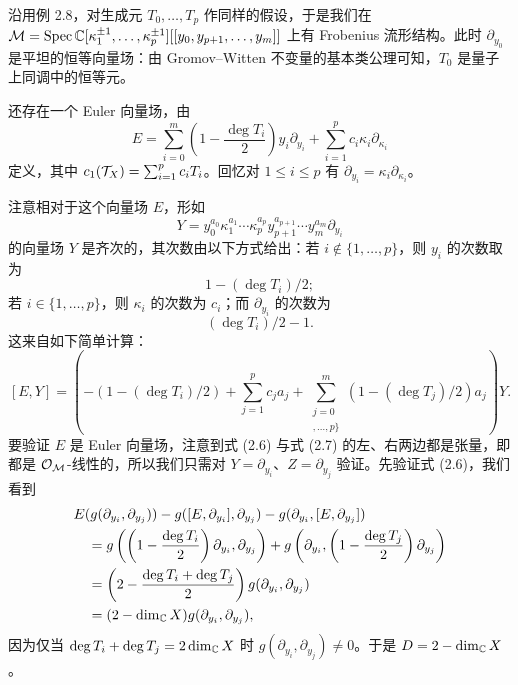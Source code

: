 \begin{example}
沿用例 2.8，对生成元 $T_0,\dots,T_p$ 作同样的假设，于是我们在 $\mathcal{M}=\operatorname{Spec}\mathbb{C}[\kappa_1^{\pm 1},\dots,\kappa_p^{\pm 1}][[y_0,y_{p+1},\dots,y_m]]$ 上有 Frobenius 流形结构。此时 $\partial_{y_0}$ 是平坦的恒等向量场：由 Gromov–Witten 不变量的基本类公理可知，$T_0$ 是量子上同调中的恒等元。

还存在一个 Euler 向量场，由
\[
E=\sum_{i=0}^{m}\left(1-\frac{\deg T_i}{2}\right)y_i\partial_{y_i}+\sum_{i=1}^{p}c_i\kappa_i\partial_{\kappa_i}
\]
定义，其中 $c_1(\mathcal{T}_X)=\sum_{i=1}^{p}c_iT_i$。回忆对 $1\le i\le p$ 有 $\partial_{y_i}=\kappa_i\partial_{\kappa_i}$。

注意相对于这个向量场 $E$，形如
\[
Y=y_0^{a_0}\kappa_1^{a_1}\cdots\kappa_p^{a_p}y_{p+1}^{a_{p+1}}\cdots y_m^{a_m}\partial_{y_i}
\]
的向量场 $Y$ 是齐次的，其次数由以下方式给出：若 $i\notin\{1,\dots,p\}$，则 $y_i$ 的次数取为
\[
1-(\deg T_i)/2;
\]
若 $i\in\{1,\dots,p\}$，则 $\kappa_i$ 的次数为 $c_i$；而 $\partial_{y_i}$ 的次数为
\[
(\deg T_i)/2-1.
\]
这来自如下简单计算：
\[
[E,Y]=\left(-(1-(\deg T_i)/2)+\sum_{j=1}^{p}c_ja_j+\sum_{\substack{j=0\\,\dots,p\}}}^{m}(1-(\deg T_j)/2)a_j\right)Y.
\]
要验证 $E$ 是 Euler 向量场，注意到式 (2.6) 与式 (2.7) 的左、右两边都是张量，即都是 $\mathcal{O}_{\mathcal{M}}$-线性的，所以我们只需对 $Y=\partial_{y_i}$、$Z=\partial_{y_j}$ 验证。先验证式 (2.6)，我们看到
\begin{align*}
&E(g(\partial_{y_i},\partial_{y_j}))-g([E,\partial_{y_i}],\partial_{y_j})-g(\partial_{y_i},[E,\partial_{y_j}])\\
&\quad=g\left(\left(1-\frac{\deg T_i}{2}\right)\partial_{y_i},\partial_{y_j}\right)+g\left(\partial_{y_i},\left(1-\frac{\deg T_j}{2}\right)\partial_{y_j}\right)\\
&\quad=\left(2-\frac{\deg T_i+\deg T_j}{2}\right)g(\partial_{y_i},\partial_{y_j})\\
&\quad=(2-\dim_{\mathbb{C}}X)g(\partial_{y_i},\partial_{y_j}),
\end{align*}
因为仅当 $\deg T_i+\deg T_j=2\dim_{\mathbb{C}}X$ 时 $g(\partial_{y_i},\partial_{y_j})\neq 0$。于是 $D=2-\dim_{\mathbb{C}}X$。



\end{example}
